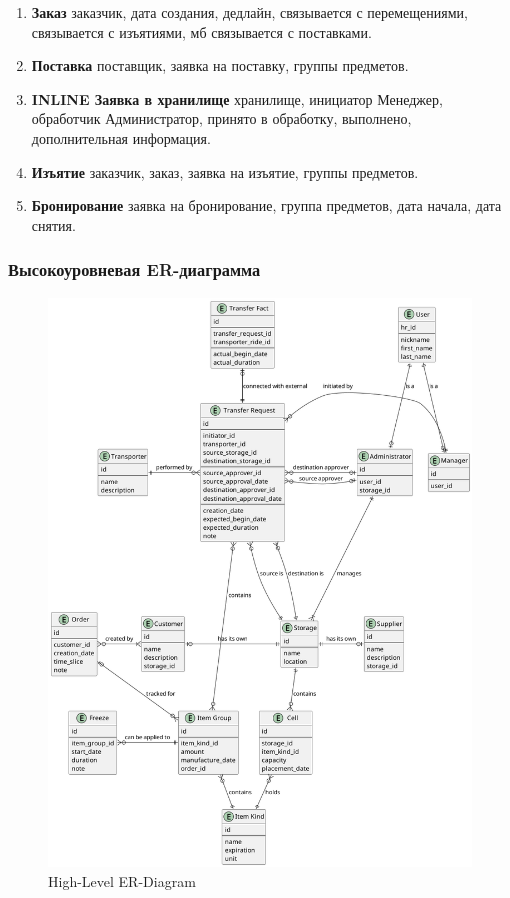 \begin{enumerate}
  \item \textbf{Заказ}
        заказчик,
        дата создания,
        дедлайн,
        связывается с перемещениями,
        связывается с изъятиями,
        мб связывается с поставками.

  \item \textbf{Поставка}
        поставщик,
        заявка на поставку,
        группы предметов.

  \item \textbf{INLINE Заявка в хранилище}
        хранилище,
        инициатор Менеджер,
        обработчик Администратор,
        принято в обработку,
        выполнено,
        дополнительная информация.

  \item \textbf{Изъятие}
        заказчик,
        заказ,
        заявка на изъятие,
        группы предметов.
  
  \item \textbf{Бронирование}
        заявка на бронирование,
        группа предметов,
        дата начала,
        дата снятия.

\end{enumerate}

\newpage

\subsubsection{Высокоуровневая ER-диаграмма}

\begin{figure}[h!]
      \centering
      \includegraphics[width=12cm]{../../out/spec/figure/er/high-level/Storage Net high-level ER Diagram.png}
      \caption{High-Level ER-Diagram}
\end{figure}

